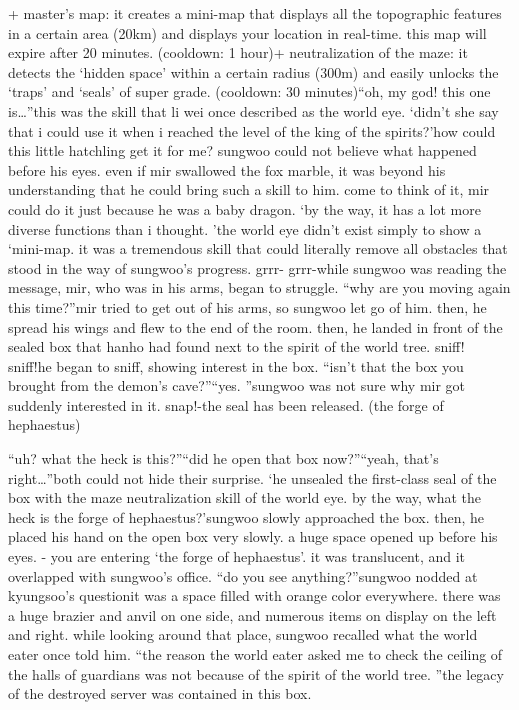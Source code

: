 + master’s map: it creates a mini-map that displays all the topographic features in a certain area (20km) and displays your location in real-time.
 this map will expire after 20 minutes.
 (cooldown: 1 hour)+ neutralization of the maze: it detects the ‘hidden space’ within a certain radius (300m) and easily unlocks the ‘traps’ and ‘seals’ of super grade.
 (cooldown: 30 minutes)“oh, my god! this one is…”this was the skill that li wei once described as the world eye.
‘didn’t she say that i could use it when i reached the level of the king of the spirits?’how could this little hatchling get it for me? sungwoo could not believe what happened before his eyes.
 even if mir swallowed the fox marble, it was beyond his understanding that he could bring such a skill to him.
come to think of it, mir could do it just because he was a baby dragon.
‘by the way, it has a lot more diverse functions than i thought.
’the world eye didn’t exist simply to show a ‘mini-map.
 it was a tremendous skill that could literally remove all obstacles that stood in the way of sungwoo’s progress.
grrr- grrr-while sungwoo was reading the message, mir, who was in his arms, began to struggle.
“why are you moving again this time?”mir tried to get out of his arms, so sungwoo let go of him.
 then, he spread his wings and flew to the end of the room.
 then, he landed in front of the sealed box that hanho had found next to the spirit of the world tree.
sniff! sniff!he began to sniff, showing interest in the box.
“isn’t that the box you brought from the demon’s cave?”“yes.
”sungwoo was not sure why mir got suddenly interested in it.
snap!-the seal has been released.
 (the forge of hephaestus)

“uh? what the heck is this?”“did he open that box now?”“yeah, that’s right…”both could not hide their surprise.
‘he unsealed the first-class seal of the box with the maze neutralization skill of the world eye.
 by the way, what the heck is the forge of hephaestus?’sungwoo slowly approached the box.
 then, he placed his hand on the open box very slowly.
a huge space opened up before his eyes.
- you are entering ‘the forge of hephaestus’.
it was translucent, and it overlapped with sungwoo’s office.
“do you see anything?”sungwoo nodded at kyungsoo’s questionit was a space filled with orange color everywhere.
 there was a huge brazier and anvil on one side, and numerous items on display on the left and right.
while looking around that place, sungwoo recalled what the world eater once told him.
“the reason the world eater asked me to check the ceiling of the halls of guardians was not because of the spirit of the world tree.
”the legacy of the destroyed server was contained in this box.


 